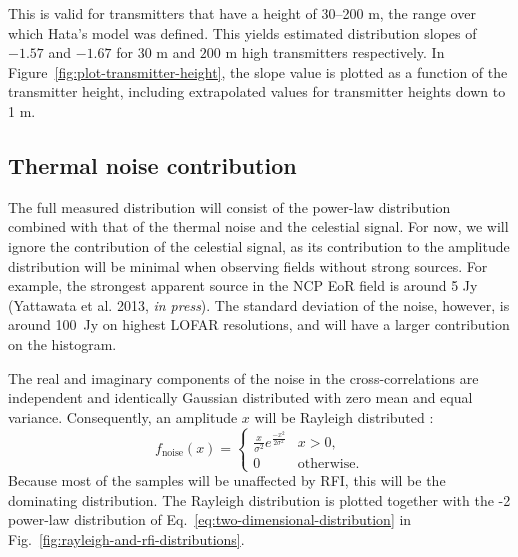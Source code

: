 \documentclass[useAMS,usenatbib]{mn2e}
\begin{document}
This is valid for transmitters that have a height of 30--200 m, the range over which Hata's model was defined. This yields estimated distribution slopes of $-1.57$ and $-1.67$ for $30$ m and $200$ m high transmitters respectively. In Figure~\ref{fig:plot-transmitter-height}, the slope value is plotted as a function of the transmitter height, including extrapolated values for transmitter heights down to 1 m.

\subsection{Thermal noise contribution} \label{sec:histogram-noise}
The full measured distribution will consist of the power-law distribution combined with that of the thermal noise and the celestial signal. For now, we will ignore the contribution of the celestial signal, as its contribution to the amplitude distribution will be minimal when observing fields without strong sources. For example, the strongest apparent source in the NCP EoR field is around 5 Jy (Yattawata et al. 2013, \textit{in press}). %
The standard deviation of the noise, however, is around 100~Jy on highest LOFAR resolutions, and will have a larger contribution on the histogram.

The real and imaginary components of the noise in the cross-correlations are independent and identically Gaussian distributed with zero mean and equal variance. Consequently, an amplitude $x$ will be Rayleigh distributed \citep[\S6-2]{papoulis-stochastic-processes}: 
\begin{equation}\label{eq:rayleigh-formula}
f_\textrm{noise}(x) =
\begin{cases}
\frac{x}{\sigma^2} e^{\frac{-x^2}{2\sigma^2}} & x > 0, \\
0 & \textrm{otherwise.}
\end{cases}
\end{equation}
Because most of the samples will be unaffected by RFI, this will be the dominating distribution. The Rayleigh distribution is plotted together with the -2 power-law distribution of Eq.~\eqref{eq:two-dimensional-distribution} in Fig.~\ref{fig:rayleigh-and-rfi-distributions}.
\end{document}
